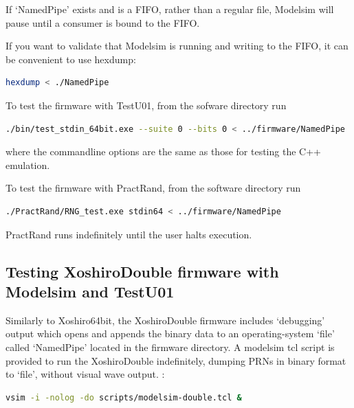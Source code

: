 \documentclass{article}
\begin{document}
If `NamedPipe' exists and is a FIFO, rather than a regular file, Modelsim will pause until a consumer is bound to the FIFO.

If you want to validate that Modelsim is running and writing to the FIFO, it can be convenient to use hexdump:

\begin{minipage}{1.0\textwidth}
\centering
\begin{lstlisting}[language=bash, label=lst:HexDumpPipe]
hexdump < ./NamedPipe
\end{lstlisting}
\end{minipage}

To test the firmware with TestU01, from the sofware directory run 

\begin{minipage}{1.0\textwidth}
\centering
\begin{lstlisting}[language=bash, label=lst:TestU01Pipe]
./bin/test_stdin_64bit.exe --suite 0 --bits 0 < ../firmware/NamedPipe
\end{lstlisting}
\end{minipage}

where the commandline options are the same as those for testing the C++ emulation.

To test the firmware with PractRand, from the software directory run 

\begin{minipage}{1.0\textwidth}
\centering
\begin{lstlisting}[language=bash , label=lst:PractRandPipe]
./PractRand/RNG_test.exe stdin64 < ../firmware/NamedPipe
\end{lstlisting}
\end{minipage}

PractRand runs indefinitely until the user halts execution.

\subsection{Testing XoshiroDouble firmware with Modelsim and TestU01}

Similarly to Xoshiro64bit, the XoshiroDouble firmware includes `debugging' output which opens and appends the binary data to an operating-system `file' called `NamedPipe' located in the firmware directory. A modelsim tcl script is provided to run the XoshiroDouble indefinitely, dumping PRNs in binary format to `file', without visual wave output. :

\begin{minipage}{1.0\textwidth}
\centering
\begin{lstlisting}[language=bash, label=lst:ModelsimDoubleNoGui]
vsim -i -nolog -do scripts/modelsim-double.tcl &
\end{lstlisting}
\end{minipage}
\end{document}
